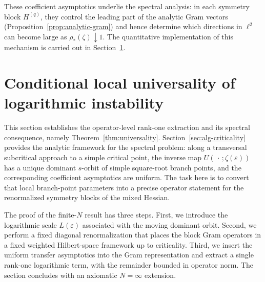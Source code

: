 \documentclass[11pt]{amsart}
\numberwithin{equation}{section}
\theoremstyle{plain}
\theoremstyle{definition}
\theoremstyle{remark}
\begin{document}
These coefficient asymptotics underlie the spectral analysis: in each symmetry block
$H^{(q)}$, they control the leading part of the analytic Gram vectors (Proposition~\ref{prop:analytic-gram})
and hence determine which directions in $\ell^2$ can become large as $\rho_*(\zeta)\downarrow1$.
The quantitative implementation of this mechanism is carried out in
Section~\ref{sec:universal-instability}.


\section{Conditional local universality of logarithmic instability}
\label{sec:universal-instability}


This section establishes the operator-level rank-one extraction and its
spectral consequence, namely Theorem~\ref{thm:universality}. Section~\ref{sec:alg-criticality} provides the analytic framework for the spectral problem: along a transversal subcritical
approach to a simple critical point, the inverse map
\(U(\,\cdot\,;\zeta(\varepsilon))\) has a unique dominant \(s\)-orbit of
simple square-root branch points, and the corresponding coefficient
asymptotics are uniform. The task here is to convert that local branch-point parameters
into a precise operator statement for the renormalized symmetry blocks of the mixed Hessian.


The proof of the finite-\(N\) result has three steps. First, we introduce the
logarithmic scale \(L(\varepsilon)\) associated with the moving dominant
orbit. Second, we perform a fixed diagonal renormalization that places the
block Gram operators in a fixed weighted Hilbert-space framework up to criticality.
Third, we insert the uniform transfer asymptotics into the Gram
representation and extract a single rank-one logarithmic term, with the
remainder bounded in operator norm. The section concludes with an axiomatic
\(N=\infty\) extension.
\end{document}
